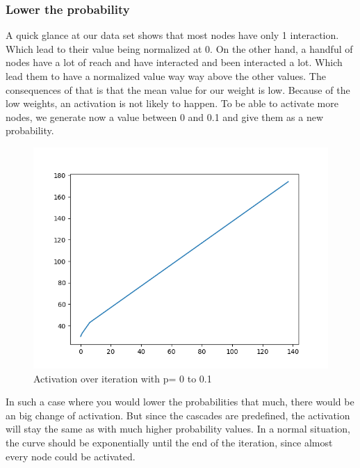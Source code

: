\subsubsection{Lower the probability}
A quick glance at our data set shows that most nodes have only 1 interaction. Which lead to their value being normalized at 0. On the other hand, a handful of nodes have a lot of reach and have interacted and been interacted a lot. 
Which lead them to have a normalized value way way above the other values.
The consequences of that is that the mean value for our weight is low. 
Because of the low weights, an activation is not likely to happen. To be able to activate more nodes, we generate now a value between 0 and 0.1 and give them as a new probability.
\begin{figure}[H]
    \centering
    \includegraphics[width=0.5\linewidth]{Report/figs/ICM-0to01.png}
    \caption{Activation over iteration with p= 0 to 0.1}
    \label{fig:icm001}
\end{figure}
\noindent In such a case where you would lower the probabilities that much, there would be an big change of activation. But since the cascades are predefined, the activation will stay the same as with much higher probability values. In a normal situation, the curve should be exponentially until the end of the iteration, since almost every node could be activated.
